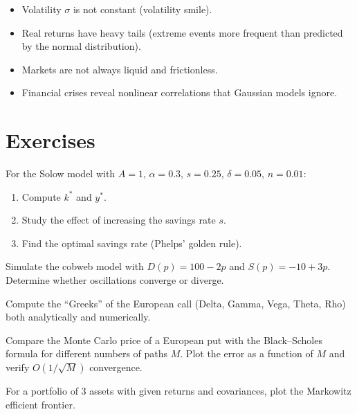 \begin{warning}[title=\textbf{Limitations of Black--Scholes}]
\begin{itemize}
  \item Volatility $\sigma$ is not constant (volatility smile).
  \item Real returns have heavy tails (extreme events more frequent
    than predicted by the normal distribution).
  \item Markets are not always liquid and frictionless.
  \item Financial crises reveal nonlinear correlations that Gaussian
    models ignore.
\end{itemize}
\end{warning}

\section{Exercises}

\begin{exercise}
For the Solow model with $A=1$, $\alpha=0.3$, $s=0.25$, $\delta=0.05$,
$n=0.01$:
\begin{enumerate}
  \item Compute $k^*$ and $y^*$.
  \item Study the effect of increasing the savings rate $s$.
  \item Find the optimal savings rate (Phelps' golden rule).
\end{enumerate}
\end{exercise}

\begin{exercise}
Simulate the cobweb model with $D(p)=100-2p$ and $S(p)=-10+3p$.
Determine whether oscillations converge or diverge.
\end{exercise}

\begin{exercise}
Compute the ``Greeks'' of the European call (Delta, Gamma, Vega,
Theta, Rho) both analytically and numerically.
\end{exercise}

\begin{exercise}
Compare the Monte Carlo price of a European put with the
Black--Scholes formula for different numbers of paths $M$.  Plot
the error as a function of $M$ and verify $O(1/\sqrt{M})$ convergence.
\end{exercise}

\begin{exercise}
For a portfolio of 3 assets with given returns and covariances,
plot the Markowitz efficient frontier.
\end{exercise}
